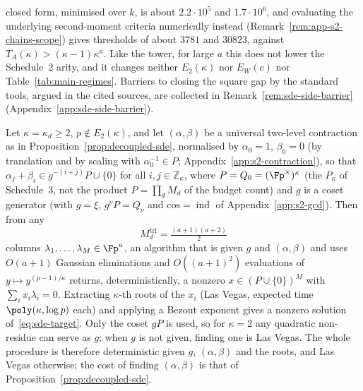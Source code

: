 \begin{remark}
closed form, minimised over $k$, is about $2.2\cdot10^5$ and $1.7\cdot10^6$, and evaluating the underlying second-moment criteria numerically instead (Remark~\ref{rem:app-s2-chains-scope}) gives thresholds of about $3781$ and $30823$, against $T_A(\kappa) > (\kappa-1)\kappa^\kappa$. Like the tower, for large $a$ this does not lower the Schedule~2 arity, and it changes neither $E_2(\kappa)$ nor $E_W(c)$ nor Table~\ref{tab:main-regimes}. Barriers to closing the square gap by the standard tools, argued in the cited sources, are collected in Remark~\ref{rem:sde-side-barrier} (Appendix~\ref{app:sde-side-barrier}).
\end{remark}

\begin{proposition}
\label{prop:triangular-sde}
Let $\kappa=\kappa_d\ge 2$, $p\notin E_2(\kappa)$, and let $(\alpha,\beta)$ be a universal two-level contraction as in Proposition~\ref{prop:decoupled-sde}, normalised by $\alpha_0=1$, $\beta_0=0$ (by translation and by scaling with $\alpha_0^{-1}\in P$; Appendix~\ref{app:s2-contraction}), so that $\alpha_j+\beta_i\in g^{-(i+j)}P\cup\{0\}$ for all $i,j\in\mathbb{Z}_\kappa$, where $P=Q_0=(\Fp^\times)^\kappa$ (the $P_\kappa$ of Schedule~3, not the product $P=\prod_d M_d$ of the budget count) and $g$ is a coset generator (with $g=\xi$, $g^{\nu}P=Q_\nu$ and $\mathrm{cos}=\operatorname{ind}$ of Appendix~\ref{app:s2-gcd}). Then from any
\[
  M_d^{\mathrm{tri}}=\tfrac{(a+1)(a+2)}{2}
\]
columns $\lambda_1,\dots,\lambda_M\in\Fp^{a}$, an algorithm that is given $g$ and $(\alpha,\beta)$ and uses $O(a+1)$ Gaussian eliminations and $O((a+1)^2)$ evaluations of $y\mapsto y^{(p-1)/\kappa}$ returns, deterministically, a nonzero $x \in (P\cup\{0\})^M$ with $\sum_i x_i\lambda_i = 0$. Extracting $\kappa$-th roots of the $x_i$ (Las Vegas, expected time $\poly(\kappa,\log p)$ each) and applying a Bezout exponent gives a nonzero solution of~\eqref{eq:sde-target}. Only the coset $gP$ is used, so for $\kappa = 2$ any quadratic non-residue can serve as $g$; when $g$ is not given, finding one is Las Vegas. The whole procedure is therefore deterministic given $g$, $(\alpha,\beta)$ and the roots, and Las Vegas otherwise; the cost of finding $(\alpha,\beta)$ is that of Proposition~\ref{prop:decoupled-sde}.
\end{proposition}


